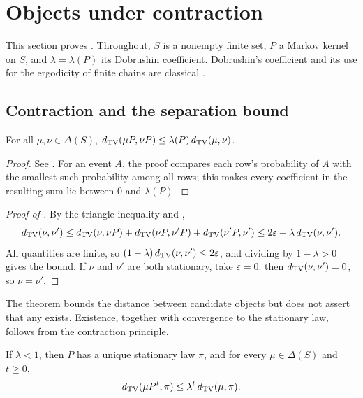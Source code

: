 \section{Objects under contraction}\label{sec:objecthood}

This section proves \thmNGObjectContractive.
Throughout, $S$ is a nonempty finite set, $P$ a Markov kernel on $S$, and $\lambda=\lambda(P)$ its Dobrushin coefficient.
Dobrushin's coefficient and its use for the ergodicity of finite chains are classical \citep{Dobrushin1956,Seneta2006}.

\subsection{Contraction and the separation bound}

\begin{lemma}\label{lem:objecthood_dobrushin}
For all $\mu,\nu\in\Delta(S)$, $d_{\mathrm{TV}}(\mu P,\nu P)\le\lambda(P)\,d_{\mathrm{TV}}(\mu,\nu)$.
\end{lemma}

\begin{proof}
See .
For an event $A$, the proof compares each row's probability of $A$ with the smallest such probability among all rows; this makes every coefficient in the resulting sum lie between $0$ and $\lambda(P)$.
\end{proof}

\begin{proof}[Proof of ]
By the triangle inequality and ,
\[
  d_{\mathrm{TV}}(\nu,\nu')\le d_{\mathrm{TV}}(\nu,\nu P)+d_{\mathrm{TV}}(\nu P,\nu'P)+d_{\mathrm{TV}}(\nu'P,\nu')\le 2\varepsilon+\lambda\,d_{\mathrm{TV}}(\nu,\nu').
\]
All quantities are finite, so $(1-\lambda)\,d_{\mathrm{TV}}(\nu,\nu')\le 2\varepsilon$, and dividing by $1-\lambda>0$ gives the bound.
If $\nu$ and $\nu'$ are both stationary, take $\varepsilon=0$: then $d_{\mathrm{TV}}(\nu,\nu')=0$, so $\nu=\nu'$.
\end{proof}

The theorem bounds the distance between candidate objects but does not assert that any exists.
Existence, together with convergence to the stationary law, follows from the contraction principle.

\begin{proposition}\label{lem:objecthood_unique_fixed}
If $\lambda<1$, then $P$ has a unique stationary law $\pi$, and for every $\mu\in\Delta(S)$ and $t\ge 0$,
\[
  d_{\mathrm{TV}}(\mu P^t,\pi)\le\lambda^t\,d_{\mathrm{TV}}(\mu,\pi).
\]
\end{proposition}

